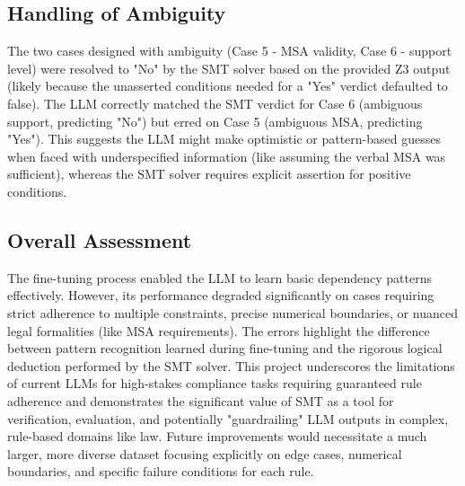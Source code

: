 \documentclass[11pt, letterpaper]{article}
\begin{document}
\subsection*{Handling of Ambiguity}
The two cases designed with ambiguity (Case 5 - MSA validity, Case 6 - support level) were resolved to "No" by the SMT solver based on the provided Z3 output (likely because the unasserted conditions needed for a "Yes" verdict defaulted to false). The LLM correctly matched the SMT verdict for Case 6 (ambiguous support, predicting "No") but erred on Case 5 (ambiguous MSA, predicting "Yes"). This suggests the LLM might make optimistic or pattern-based guesses when faced with underspecified information (like assuming the verbal MSA was sufficient), whereas the SMT solver requires explicit assertion for positive conditions.

\subsection*{Overall Assessment}
The fine-tuning process enabled the LLM to learn basic dependency patterns effectively. However, its performance degraded significantly on cases requiring strict adherence to multiple constraints, precise numerical boundaries, or nuanced legal formalities (like MSA requirements). The errors highlight the difference between pattern recognition learned during fine-tuning and the rigorous logical deduction performed by the SMT solver. This project underscores the limitations of current LLMs for high-stakes compliance tasks requiring guaranteed rule adherence and demonstrates the significant value of SMT as a tool for verification, evaluation, and potentially "guardrailing" LLM outputs in complex, rule-based domains like law. Future improvements would necessitate a much larger, more diverse dataset focusing explicitly on edge cases, numerical boundaries, and specific failure conditions for each rule.

\end{document}
